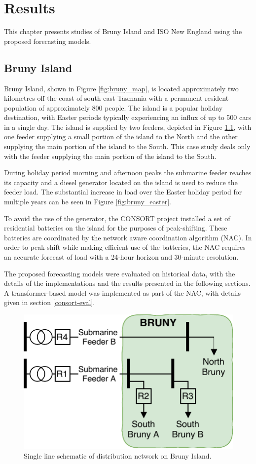 \chapter{Results}
This chapter presents studies of Bruny Island and ISO New England using the proposed forecasting models.

\section{Bruny Island}
Bruny Island, shown in Figure \ref{fig:bruny_map}, is located approximately two kilometres off the coast of south-east Tasmania with a permanent resident population of approximately 800 people.
The island is a popular holiday destination, with Easter periods typically experiencing an influx of up to 500 cars in a single day.
The island is supplied by two feeders, depicted in Figure \ref{fig:bruny_network}, with  one feeder supplying a small portion of the island to the North and the other supplying the main portion of the island to the South.
This case study deals only with the feeder supplying the main portion of the island to the South.

During holiday period morning and afternoon peaks the submarine feeder reaches its capacity and a diesel generator located on the island is used to reduce the feeder load.
The substantial increase in load over the Easter holiday period for multiple years can be seen in Figure \ref{fig:bruny_easter}.

To avoid the use of the generator, the CONSORT project installed a set of residential batteries on the island for the purposes of peak-shifting.
These batteries are coordinated by the network aware coordination algorithm (NAC).
In order to peak-shift while making efficient use of the batteries, the NAC requires an accurate forecast of load with a 24-hour horizon and 30-minute resolution.

The proposed forecasting models were evaluated on historical data, with the details of the implementations and the results presented in the following sections.
A transformer-based model was implemented as part of the NAC, with details given in section \ref{consort-eval}.

\begin{figure}[htbp]
	\centerline{\includegraphics[width=.45\textwidth]{images/bruny_single_line.pdf}}
	\caption{Single line schematic of distribution network on Bruny Island.}
	\label{fig:bruny_network}
\end{figure}

